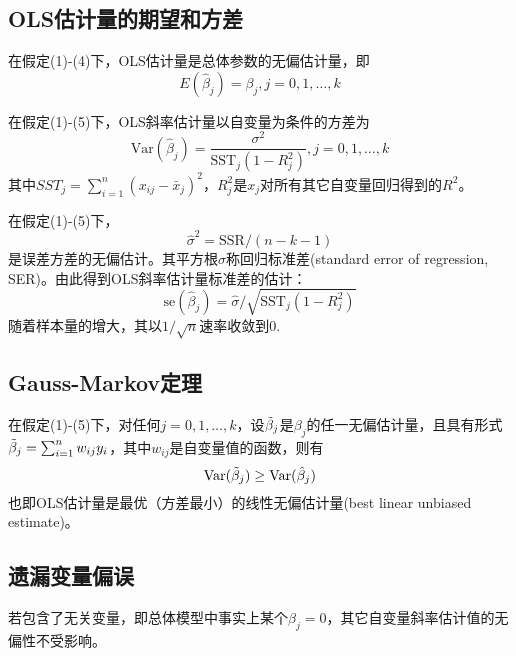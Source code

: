\subsection{OLS估计量的期望和方差}

\par 在假定(1)-(4)下，OLS估计量是总体参数的无偏估计量，即
\begin{equation}
    E(\hat{\beta}_j)=\beta_j, j=0,1,\dots,k
\end{equation}
\par 在假定(1)-(5)下，OLS斜率估计量以自变量为条件的方差为
\begin{equation}
    \text{Var}(\hat{\beta}_j)=\frac{\sigma^2}{\text{SST}_j (1-R_j^2)}, j=0,1,\dots,k \label{eq:Variance}
\end{equation}
其中$SST_j=\sum_{i=1}^n (x_{ij}-\bar{x}_j)^2$，$R_j^2$是$x_j$对所有其它自变量回归得到的$R^2$。
\par 在假定(1)-(5)下，
\begin{equation}
    \hat{\sigma}^2=\text{SSR}/(n-k-1)
\end{equation}
是误差方差的无偏估计。其平方根$\hat{\sigma}$称回归标准差(standard error of regression, SER)。由此得到OLS斜率估计量标准差的估计：
\begin{equation}
    \text{se}(\hat{\beta}_j)=\hat{\sigma}/\sqrt{\text{SST}_j(1-R_j^2)}
\end{equation}
随着样本量的增大，其以$1/\sqrt{n}$速率收敛到0.

\subsection{Gauss-Markov定理}

\par 在假定(1)-(5)下，对任何$j=0,1,\dots,k$，设$\Tilde{\beta}_j$是$\beta_j$的任一无偏估计量，且具有形式$\Tilde{\beta}_j=\sum_{i=1}^n w_{ij}y_i$，其中$w_{ij}$是自变量值的函数，则有
\begin{equation}
    \text{Var}(\Tilde{\beta}_j)\ge \text{Var}(\hat{\beta}_j)
\end{equation}
也即OLS估计量是最优（方差最小）的线性无偏估计量(best linear unbiased estimate)。

\subsection{遗漏变量偏误}

\par 若包含了无关变量，即总体模型中事实上某个$\beta_j=0$，其它自变量斜率估计值的无偏性不受影响。

